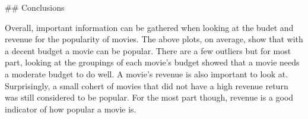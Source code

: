 \documentclass[11pt]{article}
\begin{document}
     \#\# Conclusions

Overall, important information can be gathered when looking at the budet
and revenue for the popularity of movies. The above plots, on average,
show that with a decent budget a movie can be popular. There are a few
outliers but for most part, looking at the groupings of each movie's
budget showed that a movie needs a moderate budget to do well. A movie's
revenue is also important to look at. Surprisingly, a small cohert of
movies that did not have a high revenue return was still considered to
be popular. For the most part though, revenue is a good indicator of how
popular a movie is.


    
    
    
    
\end{document}
